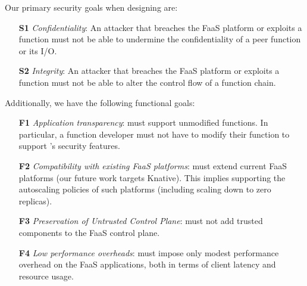 %
%
Our primary security goals when designing \SystemName are:
%
\begin{itemize}
    \item[\textbf{S1}] \emph{Confidentiality}: 
        An attacker that breaches the FaaS platform or exploits a function must
        not be able to undermine the confidentiality of a peer function or its
        I/O\@.
    \item[\textbf{S2}] \emph{Integrity}:
        An attacker that breaches the FaaS platform or exploits a function
        must not be able to alter the control flow of a function chain.
\end{itemize}
%
Additionally, we have the following functional goals:
%
\begin{itemize}
    \item[\textbf{F1}] \emph{Application transparency}: \SystemName must
        support unmodified functions.
        In particular, a function developer must not have to modify their
        function to support \SystemName's security features.
    \item[\textbf{F2}] \emph{Compatibility with existing FaaS platforms}:
        \SystemName must extend current FaaS platforms (our future work
        targets Knative).
        This implies supporting the autoscaling policies of such platforms
        (including scaling down to zero replicas).
    \item[\textbf{F3}] \emph{Preservation of Untrusted Control Plane}:
        \SystemName must not add trusted components to the FaaS control plane.
    \item[\textbf{F4}] \emph{Low performance overheads}:
        \SystemName must impose only modest performance overhead on the
        FaaS applications, both in terms of client latency and
        resource usage.
\end{itemize}
